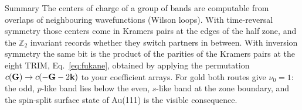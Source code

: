 \begin{keybox}{Summary}
The centers of charge of a group of bands are computable from overlaps of
neighbouring wavefunctions (Wilson loops). With time-reversal symmetry
those centers come in Kramers pairs at the edges of the half zone, and the
$\mathbb{Z}_2$ invariant records whether they switch partners in between.
With inversion symmetry the same bit is the product of the parities of the
Kramers pairs at the eight TRIM, Eq.~\eqref{eq:fukane}, obtained by
applying the permutation $c(\mathbf{G}) \to c(-\mathbf{G}-2\mathbf{k})$ to your coefficient
arrays. For gold both routes give $\nu_0 = 1$: the odd, $p$-like band lies
below the even, $s$-like band at the zone boundary, and the spin-split
surface state of Au(111) is the visible consequence.
\end{keybox}
